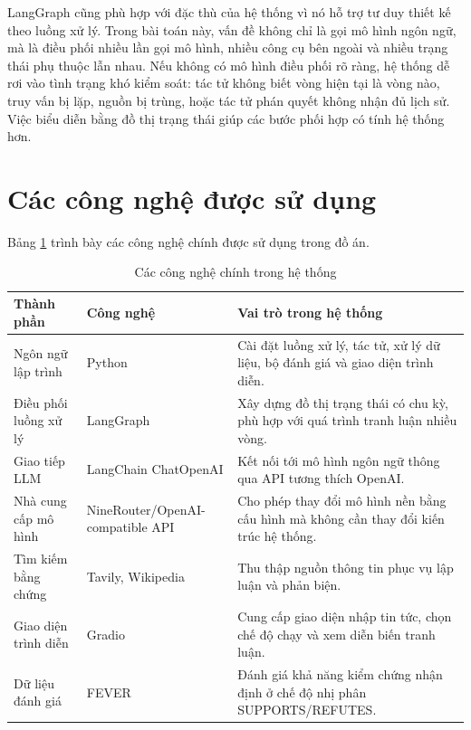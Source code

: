 ﻿\documentclass[oneside,a4paper,12pt]{extreport}
\begin{document}
LangGraph cũng phù hợp với đặc thù của hệ thống vì nó hỗ trợ tư duy thiết kế theo luồng xử lý. Trong bài toán này, vấn đề không chỉ là gọi mô hình ngôn ngữ, mà là điều phối nhiều lần gọi mô hình, nhiều công cụ bên ngoài và nhiều trạng thái phụ thuộc lẫn nhau. Nếu không có mô hình điều phối rõ ràng, hệ thống dễ rơi vào tình trạng khó kiểm soát: tác tử không biết vòng hiện tại là vòng nào, truy vấn bị lặp, nguồn bị trùng, hoặc tác tử phán quyết không nhận đủ lịch sử. Việc biểu diễn bằng đồ thị trạng thái giúp các bước phối hợp có tính hệ thống hơn.



\section{Các công nghệ được sử dụng}

Bảng \ref{tab:technologies} trình bày các công nghệ chính được sử dụng trong đồ án.

\begin{table}[H]
\centering
\caption{Các công nghệ chính trong hệ thống}
\label{tab:technologies}
\begin{tabular}{|p{4cm}|p{4cm}|p{6cm}|}
\hline
\textbf{Thành phần} & \textbf{Công nghệ} & \textbf{Vai trò trong hệ thống} \\
\hline
Ngôn ngữ lập trình & Python & Cài đặt luồng xử lý, tác tử, xử lý dữ liệu, bộ đánh giá và giao diện trình diễn. \\
\hline
Điều phối luồng xử lý & LangGraph & Xây dựng đồ thị trạng thái có chu kỳ, phù hợp với quá trình tranh luận nhiều vòng. \\
\hline
Giao tiếp LLM & LangChain ChatOpenAI & Kết nối tới mô hình ngôn ngữ thông qua API tương thích OpenAI. \\
\hline
Nhà cung cấp mô hình & NineRouter/OpenAI-compatible API & Cho phép thay đổi mô hình nền bằng cấu hình mà không cần thay đổi kiến trúc hệ thống. \\
\hline
Tìm kiếm bằng chứng & Tavily, Wikipedia & Thu thập nguồn thông tin phục vụ lập luận và phản biện. \\
\hline
Giao diện trình diễn & Gradio & Cung cấp giao diện nhập tin tức, chọn chế độ chạy và xem diễn biến tranh luận. \\
\hline
Dữ liệu đánh giá & FEVER & Đánh giá khả năng kiểm chứng nhận định ở chế độ nhị phân SUPPORTS/REFUTES. \\
\hline
\end{tabular}
\end{table}
\end{document}
